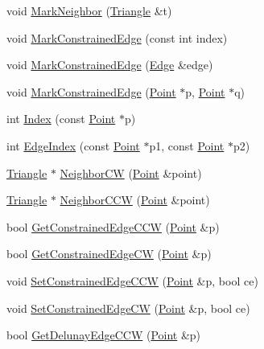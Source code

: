 \begin{DoxyCompactItemize}
void \hyperlink{classp2t_1_1_triangle_a4397122da4abb7940da1f8609973a8f4}{Mark\+Neighbor} (\hyperlink{classp2t_1_1_triangle}{Triangle} \&t)
\item 
void \hyperlink{classp2t_1_1_triangle_a519f4f7a7a72223838d3e49c4745e717}{Mark\+Constrained\+Edge} (const int index)
\item 
void \hyperlink{classp2t_1_1_triangle_a40155610e44359717c4689af073bf792}{Mark\+Constrained\+Edge} (\hyperlink{structp2t_1_1_edge}{Edge} \&edge)
\item 
void \hyperlink{classp2t_1_1_triangle_a4eaa58a5b6a62a25911ef23cd489ecff}{Mark\+Constrained\+Edge} (\hyperlink{structp2t_1_1_point}{Point} $\ast$p, \hyperlink{structp2t_1_1_point}{Point} $\ast$q)
\item 
int \hyperlink{classp2t_1_1_triangle_a0215092bb64e831308bf5fcefd065337}{Index} (const \hyperlink{structp2t_1_1_point}{Point} $\ast$p)
\item 
int \hyperlink{classp2t_1_1_triangle_ad63ce0b5e1642a0905f75863720b0f24}{Edge\+Index} (const \hyperlink{structp2t_1_1_point}{Point} $\ast$p1, const \hyperlink{structp2t_1_1_point}{Point} $\ast$p2)
\item 
\hyperlink{classp2t_1_1_triangle}{Triangle} $\ast$ \hyperlink{classp2t_1_1_triangle_a1fc0b7c7e75953573ebcf042b19bb8cc}{Neighbor\+C\+W} (\hyperlink{structp2t_1_1_point}{Point} \&point)
\item 
\hyperlink{classp2t_1_1_triangle}{Triangle} $\ast$ \hyperlink{classp2t_1_1_triangle_a73e3ecdd02a0d387d7c1727b764fd29e}{Neighbor\+C\+C\+W} (\hyperlink{structp2t_1_1_point}{Point} \&point)
\item 
bool \hyperlink{classp2t_1_1_triangle_a9e58db457c2aeedc9e913a387acdbdcc}{Get\+Constrained\+Edge\+C\+C\+W} (\hyperlink{structp2t_1_1_point}{Point} \&p)
\item 
bool \hyperlink{classp2t_1_1_triangle_a1b2cb367f2d37df28729554e81a8a349}{Get\+Constrained\+Edge\+C\+W} (\hyperlink{structp2t_1_1_point}{Point} \&p)
\item 
void \hyperlink{classp2t_1_1_triangle_a756ab18c4a3ee05dc4b05ed398cd24e8}{Set\+Constrained\+Edge\+C\+C\+W} (\hyperlink{structp2t_1_1_point}{Point} \&p, bool ce)
\item 
void \hyperlink{classp2t_1_1_triangle_a4f8c729e2eb81de8ddc87c299a2a4acc}{Set\+Constrained\+Edge\+C\+W} (\hyperlink{structp2t_1_1_point}{Point} \&p, bool ce)
\item 
bool \hyperlink{classp2t_1_1_triangle_a49c42af5395b1e91bbdbf60e54a2ed5c}{Get\+Delunay\+Edge\+C\+C\+W} (\hyperlink{structp2t_1_1_point}{Point} \&p)

\end{DoxyCompactItemize}
